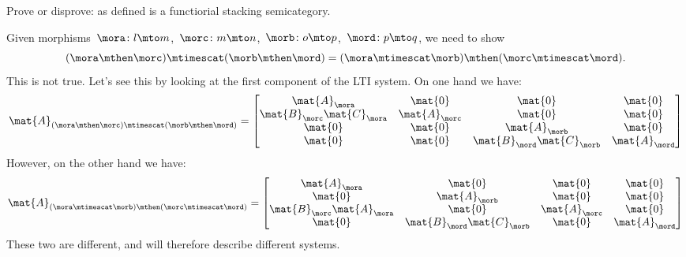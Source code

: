 \begin{exercise}
    Prove or disprove: \LTI as defined is a functiorial stacking semicategory.
\end{exercise}
\begin{solution}
    Given morphisms~$\mora\colon l\mto m$,~$\morc\colon m\mto n$,~$\morb\colon o\mto p$,~$\mord\colon p\mto q$, we need to show
    \begin{equation*}
        (\mora \mthen \morc)\mtimescat (\morb\mthen \mord)=(\mora\mtimescat \morb)\mthen (\morc\mtimescat \mord).
    \end{equation*}
    This is not true.
    Let's see this by looking at the first component of the LTI system.
    On one hand we have:
    \begin{equation*}
        \mat{A}_{(\mora \mthen \morc)\mtimescat (\morb\mthen \mord)}=
        \begin{bmatrix}
            \mat{A}_\mora              & \mat{0}       & \mat{0}                    & \mat{0}       \\
            \mat{B}_\morc\mat{C}_\mora & \mat{A}_\morc & \mat{0}                    & \mat{0}       \\
            \mat{0}                    & \mat{0}       & \mat{A}_\morb              & \mat{0}       \\
            \mat{0}                    & \mat{0}       & \mat{B}_\mord\mat{C}_\morb & \mat{A}_\mord
        \end{bmatrix}
    \end{equation*}
    However, on the other hand we have:
    \begin{equation*}
        \mat{A}_{(\mora\mtimescat \morb)\mthen (\morc\mtimescat \mord)}=
        \begin{bmatrix}
            \mat{A}_\mora               & \mat{0}                     & \mat{0}       & \mat{0}       \\
            \mat{0}                     & \mat{A}_\morb               & \mat{0}       & \mat{0}       \\
            \mat{B}_\morc \mat{A}_\mora & \mat{0}                     & \mat{A}_\morc & \mat{0}       \\
            \mat{0}                     & \mat{B}_\mord \mat{C}_\morb & \mat{0}       & \mat{A}_\mord
        \end{bmatrix}
    \end{equation*}
    These two are different, and will therefore describe different systems.
\end{solution}
